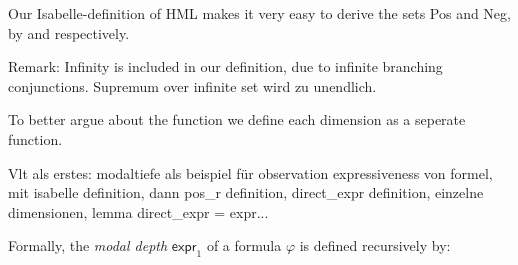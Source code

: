 \begin{isabellebody}
\begin{isamarkuptext}
Our Isabelle-definition of HML makes it very easy to derive the sets Pos and Neg, by  and  respectively.

Remark: Infinity is included in our definition, due to infinite branching conjunctions. Supremum over infinite set wird zu unendlich.%
\end{isamarkuptext}\isamarkuptrue%
%
\begin{isamarkuptext}%
To better argue about the function we define each dimension as a seperate function.%
\end{isamarkuptext}\isamarkuptrue%
%
\begin{isamarkuptext}%
Vlt als erstes: modaltiefe als beispiel für observation expressiveness von formel, mit isabelle definition,
dann pos\_r definition,
direct\_expr definition,
einzelne dimensionen,
lemma direct\_expr = expr...%
\end{isamarkuptext}\isamarkuptrue%
%
\begin{isamarkuptext}%
Formally, the \textit{modal depth} $\textsf{expr}_1$ of a formula $\varphi$ is defined recursively by:


\end{isamarkuptext}
\end{isabellebody}

